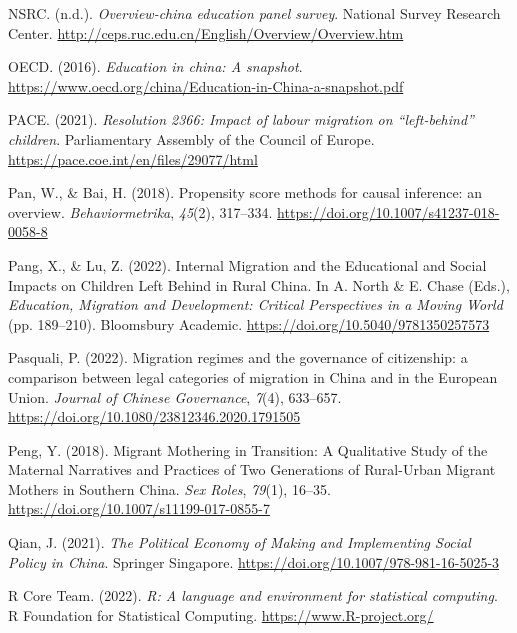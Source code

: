 \documentclass[
  man,floatsintext]{apa7}
\newlength{\cslhangindent}
\newlength{\cslentryspacingunit} %
\newenvironment{CSLReferences}[2] %
 {%
  \setlength{\parindent}{0pt}
  \ifodd #1
  \let\oldpar\par
  \def\par{\hangindent=\cslhangindent\oldpar}
  \fi
  \setlength{\parskip}{#2\cslentryspacingunit}
 }%
 {}
\begin{document}
\begin{CSLReferences}{1}{0}
\leavevmode{}%
NSRC. (n.d.). \emph{Overview-china education panel survey}. National Survey Research Center. \url{http://ceps.ruc.edu.cn/English/Overview/Overview.htm}

\leavevmode{}%
OECD. (2016). \emph{Education in china: A snapshot}. \url{https://www.oecd.org/china/Education-in-China-a-snapshot.pdf}

\leavevmode{}%
PACE. (2021). \emph{Resolution 2366: Impact of labour migration on {``}left-behind{''} children}. Parliamentary Assembly of the Council of Europe. \url{https://pace.coe.int/en/files/29077/html}

\leavevmode{}%
Pan, W., \& Bai, H. (2018). Propensity score methods for causal inference: an overview. \emph{Behaviormetrika}, \emph{45}(2), 317--334. \url{https://doi.org/10.1007/s41237-018-0058-8}

\leavevmode{}%
Pang, X., \& Lu, Z. (2022). Internal Migration and the Educational and Social Impacts on Children Left Behind in Rural China. In A. North \& E. Chase (Eds.), \emph{Education, Migration and Development: Critical Perspectives in a Moving World} (pp. 189--210). Bloomsbury Academic. \url{https://doi.org/10.5040/9781350257573}

\leavevmode{}%
Pasquali, P. (2022). Migration regimes and the governance of citizenship: a comparison between legal categories of migration in China and in the European Union. \emph{Journal of Chinese Governance}, \emph{7}(4), 633--657. \url{https://doi.org/10.1080/23812346.2020.1791505}

\leavevmode{}%
Peng, Y. (2018). Migrant Mothering in Transition: A Qualitative Study of the Maternal Narratives and Practices of Two Generations of Rural-Urban Migrant Mothers in Southern China. \emph{Sex Roles}, \emph{79}(1), 16--35. \url{https://doi.org/10.1007/s11199-017-0855-7}

\leavevmode{}%
Qian, J. (2021). \emph{The Political Economy of Making and Implementing Social Policy in China}. Springer Singapore. \url{https://doi.org/10.1007/978-981-16-5025-3}

\leavevmode{}%
R Core Team. (2022). \emph{R: A language and environment for statistical computing}. R Foundation for Statistical Computing. \url{https://www.R-project.org/}


\end{CSLReferences}
\end{document}
